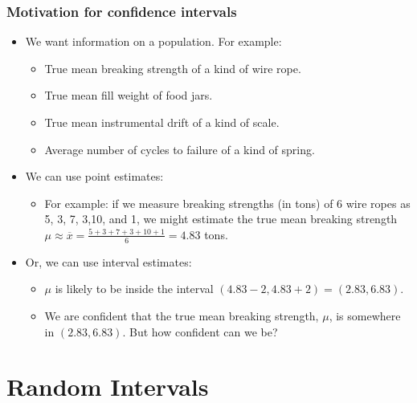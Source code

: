 \documentclass[handout]{beamer}\usepackage[]{graphicx}\usepackage[]{color}
\providecommand{\ov}[1]{\overline{#1}}
\numberwithin{equation}{section}
\begin{document}
\begin{frame}
\frametitle{Motivation for confidence intervals}
\begin{itemize}
\item We want information on a population. For example:
\begin{itemize}
\pause \item True mean breaking strength of a kind of wire rope.
\pause \item True mean fill weight of food jars.
\pause \item True mean instrumental drift of a kind of scale.
\pause \item Average number of cycles to failure of a kind of spring. 
\end{itemize}
\pause \item We can use point estimates:
\begin{itemize}
\pause \item For example: if we measure breaking strengths (in tons) of 6 wire ropes as 5, 3, 7, 3,10, and 1,  we might estimate the true mean breaking strength $\mu \approx \ov{x} = \frac{5+3+7+3+10+1}{6} = 4.83$ tons.
\end{itemize}
\pause \item Or, we can use interval estimates:
\begin{itemize}
\pause \item $\mu$ is likely to be inside the interval $(4.83 - 2, 4.83 + 2) = (2.83, 6.83)$.
\pause \item We are confident that the true mean breaking strength, $\mu$, is somewhere in $(2.83, 6.83)$. But how confident can we be?
\end{itemize}
\end{itemize}
\end{frame}






\section{Random Intervals}
\end{document}
